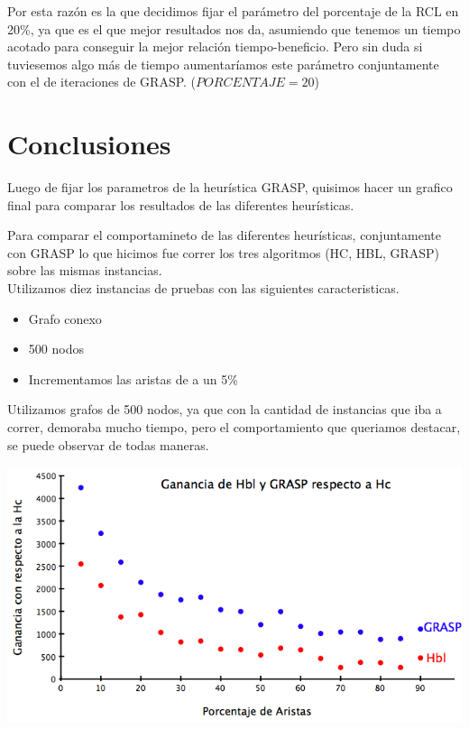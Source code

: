 \documentclass[a4paper, 10pt]{article}
\begin{document}
Por esta raz\'on es la que decidimos fijar el par\'ametro del porcentaje de la RCL en 20\%, ya que es el que mejor resultados nos da, asumiendo que tenemos un tiempo acotado para conseguir la mejor relaci\'on tiempo-beneficio. Pero sin duda si tuviesemos algo m\'as de tiempo aumentar\'iamos este par\'ametro conjuntamente con el de iteraciones de GRASP. ($PORCENTAJE = 20$) \\

\newpage

\section{Conclusiones}

Luego de fijar los parametros de la heur\'istica GRASP, quisimos hacer un grafico final para comparar los resultados de las diferentes heur\'isticas.

Para comparar el comportamineto de las diferentes heur\'isticas, conjuntamente con GRASP lo que hicimos fue correr los tres algoritmos (HC, HBL, GRASP) sobre las mismas instancias. \\
Utilizamos diez instancias de pruebas con las siguientes caracteristicas.
\begin{itemize}
	\item Grafo conexo
	\item 500 nodos
	\item Incrementamos las aristas de a un 5\%
\end{itemize}

Utilizamos grafos de 500 nodos, ya que con la cantidad de instancias que iba a correr, demoraba mucho tiempo, pero el comportamiento que queriamos destacar, se puede observar de todas maneras.

\begin{center}
	\includegraphics[scale=0.50]{Graficos/07-01.png}
\end{center}
\end{document}

